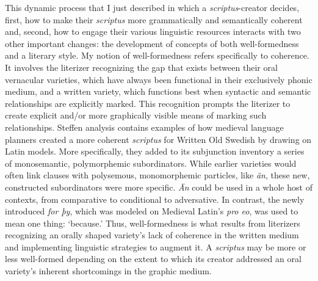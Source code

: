 This dynamic process that I just described in which a \textit{scriptus}{}-creator decides, first, how to make their \textit{scriptus} more grammatically and semantically coherent and, second, how to engage their various linguistic resources interacts with two other important changes: the development of concepts of both well-formedness and a literary style. My notion of well-formedness refers specifically to coherence. It involves the literizer recognizing the gap that exists between their oral vernacular varieties, which have always been functional in their exclusively phonic medium, and a written variety, which functions best when syntactic and semantic relationships are explicitly marked. This recognition prompts the literizer to create explicit and/or more graphically visible means of marking such relationships. Steffen  analysis contains examples of how medieval language planners created a more coherent \textit{scriptus} for Written Old Swedish by drawing on Latin models. More specifically, they added to its subjunction inventory a series of monosemantic, polymorphemic subordinators. While earlier varieties would often link clauses with polysemous, monomorphemic particles, like \textit{än}, these new, constructed subordinators were more specific. \textit{Än} could be used in a whole host of contexts, from comparative to conditional to adversative. In contrast, the newly introduced \textit{for þy}, which was modeled on Medieval Latin’s \textit{pro eo}, was used to mean one thing: ‘because.’ Thus, well-formedness is what results from literizers recognizing an orally shaped variety’s lack of coherence in the written medium and implementing linguistic strategies to augment it. A \textit{scriptus} may be more or less well-formed depending on the extent to which its creator addressed an oral variety’s inherent shortcomings in the graphic medium. 

